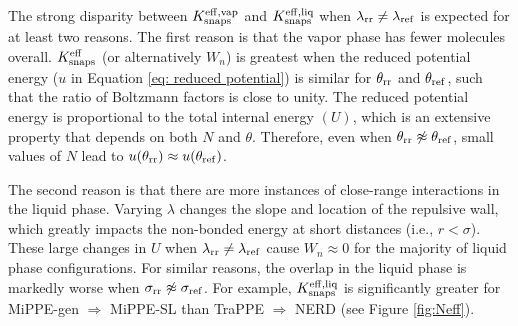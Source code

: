 \documentclass[journal=jced,manuscript=article]{achemso}
\begin{document}
The strong disparity between $K_{\rm snaps}^{\rm eff, vap}$ and $K_{\rm snaps}^{\rm eff, liq}$ when $\lambda_{\rm rr} \neq \lambda_{\rm ref}$ is expected for at least two reasons. The first reason is that the vapor phase has fewer molecules overall. $K_{\rm snaps}^{\rm eff}$ (or alternatively $W_n$) is greatest when the reduced potential energy ($u$ in Equation \ref{eq: reduced potential}) is similar for $\theta_{\rm rr}$ and $\theta_{\rm ref}$, such that the ratio of Boltzmann factors is close to unity. The reduced potential energy is proportional to the total internal energy $(U)$, which is an extensive property that depends on both $N$ and $\theta$. Therefore, even when $\theta_{\rm rr} \not\approx \theta_{\rm ref}$, small values of $N$ lead to $u(\theta_{\rm rr}) \approx u(\theta_{\rm ref})$. 

The second reason is that there are more instances of close-range interactions in the liquid phase. Varying $\lambda$ changes the slope and location of the repulsive wall, which greatly impacts the non-bonded energy at short distances (i.e., $r < \sigma$). These large changes in $U$ when $\lambda_{\rm rr} \neq \lambda_{\rm ref}$ cause $W_n \approx 0$ for the majority of liquid phase configurations. For similar reasons, the overlap in the liquid phase is markedly worse when $\sigma_{\rm rr} \not\approx \sigma_{\rm ref}$. For example, $K_{\rm snaps}^{\rm eff, liq}$ is significantly greater for MiPPE-gen $\Rightarrow$ MiPPE-SL than TraPPE $\Rightarrow$ NERD (see Figure \ref{fig:Neff}). 




\end{document}
